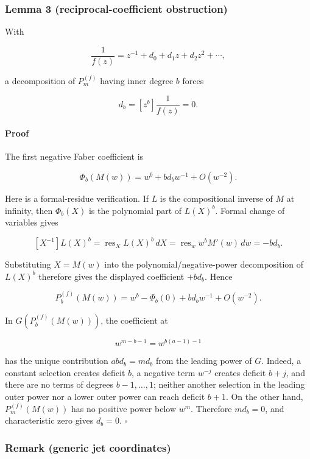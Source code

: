 \documentclass[11pt]{article}
\theoremstyle{keio}
\theoremstyle{definition}
\theoremstyle{remark}
\begin{document}
\subsubsection{Lemma 3 (reciprocal-coefficient obstruction)}
\label{sec:reciprocal-coefficient-obstruction}

With

\[
 \frac1{f(z)}=z^{-1}+d_0+d_1z+d_2z^2+\cdots,
\]

a decomposition of \(P_m^{(f)}\) having inner degree \(b\) forces

\[
 d_b=[z^b]\frac1{f(z)}=0.
\]

\paragraph{Proof}

The first negative Faber coefficient is

\[
 \Phi_b(M(w))=w^b+b d_bw^{-1}+O(w^{-2}).
\]

Here is a formal-residue verification. If \(L\) is the compositional
inverse of \(M\) at infinity, then \(\Phi_b(X)\) is the polynomial part of
\(L(X)^b\). Formal change of variables gives

\[
 [X^{-1}]L(X)^b
 =\operatorname {res}_X L(X)^b\,dX
 =\operatorname {res}_w w^bM'(w)\,dw
 =-bd_b.
\]

Substituting \(X=M(w)\) into the polynomial/negative-power decomposition of
\(L(X)^b\) therefore gives the displayed coefficient \(+bd_b\). Hence

\[
 P_b^{(f)}(M(w))
 =w^b-\Phi_b(0)+bd_bw^{-1}+O(w^{-2}).
\]

In \(G(P_b^{(f)}(M(w)))\), the coefficient at

\[
 w^{m-b-1}=w^{b(a-1)-1}
\]

has the unique contribution \(ab d_b=md_b\) from the leading power of
\(G\). Indeed, a constant selection creates deficit \(b\), a negative term
\(w^{-j}\) creates deficit \(b+j\), and there are no terms of degrees
\(b-1,\ldots,1\); neither another selection in the leading outer power nor
a lower outer power can reach deficit \(b+1\). On the other hand,
\(P_m^{(f)}(M(w))\) has no positive power below \(w^m\). Therefore
\(md_b=0\), and characteristic zero gives \(d_b=0\). \(\square\)

\subsubsection{Remark (generic jet coordinates)}
\end{document}
